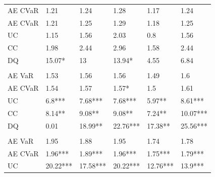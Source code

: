 \documentclass[a4paper, twoside]{templates/ociamthesis}
\begin{document}
\begin{table}
\begin{threeparttable}
\begin{tabular}[t]{llllll}
\hspace{1em}\hspace{1em}AE CVaR & 1.21 & 1.24 & 1.28 & 1.17 & 1.24\\
\hspace{1em}\hspace{1em}AE CVaR & 1.21 & 1.25 & 1.29 & 1.18 & 1.25\\
\hspace{1em}\hspace{1em}UC & 1.15 & 1.56 & 2.03 & 0.8 & 1.56\\
\hspace{1em}\hspace{1em}CC & 1.98 & 2.44 & 2.96 & 1.58 & 2.44\\
\hspace{1em}\hspace{1em}DQ & 15.07* & 13 & 13.94* & 4.55 & 6.84\\
\addlinespace[0.3em]
\multicolumn{6}{l}{\textbf{Panel D: T}}\\
\hspace{1em}\hspace{1em}AE VaR & 1.53 & 1.56 & 1.56 & 1.49 & 1.6\\
\hspace{1em}\hspace{1em}AE CVaR & 1.54 & 1.57 & 1.57* & 1.5 & 1.61\\
\hspace{1em}\hspace{1em}UC & 6.8*** & 7.68*** & 7.68*** & 5.97** & 8.61***\\
\hspace{1em}\hspace{1em}CC & 8.14** & 9.08** & 9.08** & 7.24** & 10.07***\\
\hspace{1em}\hspace{1em}DQ & 0.01 & 18.99** & 22.76*** & 17.38** & 25.56***\\
\addlinespace[0.3em]
\multicolumn{6}{l}{\textbf{Panel E: N}}\\
\hspace{1em}\hspace{1em}AE VaR & 1.95 & 1.88 & 1.95 & 1.74 & 1.78\\
\hspace{1em}\hspace{1em}AE CVaR & 1.96*** & 1.89*** & 1.96*** & 1.75*** & 1.79***\\
\hspace{1em}\hspace{1em}UC & 20.22*** & 17.58*** & 20.22*** & 12.76*** & 13.9***\\

\end{tabular}
\end{threeparttable}
\end{table}
\end{document}
